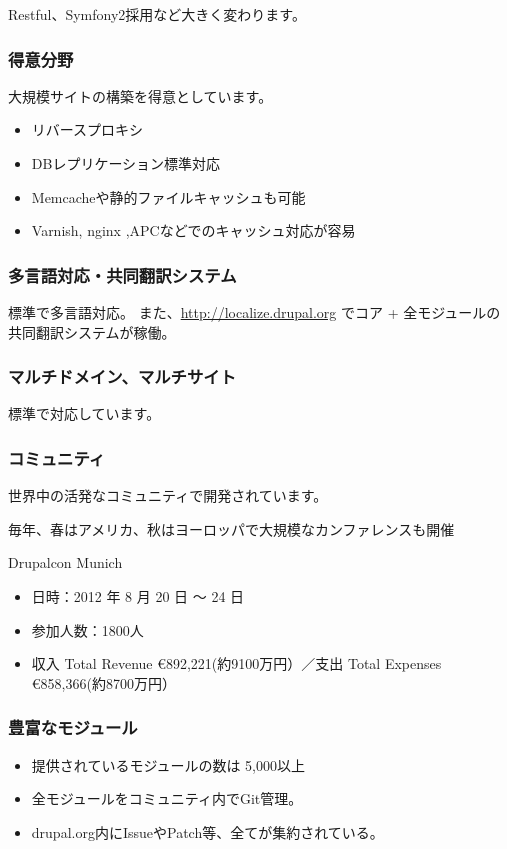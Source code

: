 \documentclass[mingoth,a4paper]{jsarticle}
\begin{document}
Restful、Symfony2採用など大きく変わります。

\subsubsection{得意分野}
大規模サイトの構築を得意としています。
\begin{itemize}
\item リバースプロキシ
\item DBレプリケーション標準対応
\item Memcacheや静的ファイルキャッシュも可能
\item Varnish, nginx ,APCなどでのキャッシュ対応が容易
\end{itemize}

\subsubsection{多言語対応・共同翻訳システム}
標準で多言語対応。
また、\url{http://localize.drupal.org} でコア + 全モジュールの共同翻訳システムが稼働。

\subsubsection{マルチドメイン、マルチサイト}
標準で対応しています。

\subsubsection{コミュニティ}
世界中の活発なコミュニティで開発されています。

毎年、春はアメリカ、秋はヨーロッパで大規模なカンファレンスも開催

\begin{itembox}[l]{Drupalcon Munich}
  \begin{itemize}
  \item 日時：2012 年 8 月 20 日 〜 24 日
  \item 参加人数：1800人
  \item 収入 Total Revenue \euro 892,221(約9100万円）／支出 Total Expenses \euro 858,366(約8700万円）
  \end{itemize}
\end{itembox}

\subsubsection{豊富なモジュール}
\begin{itemize}
\item 提供されているモジュールの数は 5,000以上
\item 全モジュールをコミュニティ内でGit管理。
\item drupal.org内にIssueやPatch等、全てが集約されている。
\end{itemize}
\end{document}
